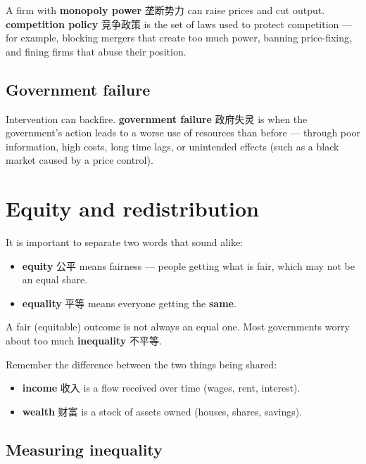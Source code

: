 \documentclass[11pt]{article}
\begin{document}
A firm with \textbf{monopoly power} 垄断势力 can raise prices and cut output. \textbf{competition policy} 竞争政策 is the set of laws used to protect competition — for example, blocking mergers that create too much power, banning price-fixing, and fining firms that abuse their position.

\subsection*{Government failure}

Intervention can backfire. \textbf{government failure} 政府失灵 is when the government's action leads to a worse use of resources than before — through poor information, high costs, long time lags, or unintended effects (such as a black market caused by a price control).

\section*{Equity and redistribution}

It is important to separate two words that sound alike:

\begin{itemize}
\item \textbf{equity} 公平 means fairness — people getting what is fair, which may not be an equal share.

\item \textbf{equality} 平等 means everyone getting the \textbf{same}.

\end{itemize}

A fair (equitable) outcome is not always an equal one. Most governments worry about too much \textbf{inequality} 不平等.

Remember the difference between the two things being shared:

\begin{itemize}
\item \textbf{income} 收入 is a flow received over time (wages, rent, interest).

\item \textbf{wealth} 财富 is a stock of assets owned (houses, shares, savings).

\end{itemize}

\subsection*{Measuring inequality}
\end{document}
